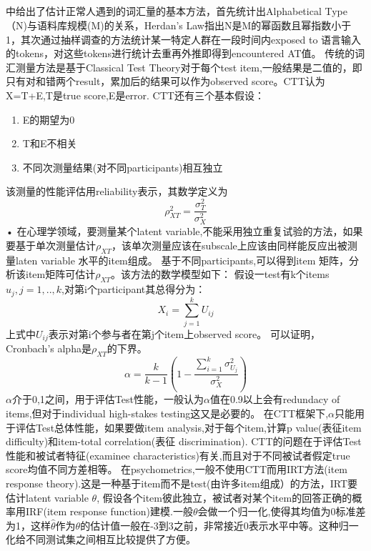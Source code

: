 \documentclass[12pt]{article}
\begin{document}
\subsection{\textbf{}}
\cite{Bib4}中给出了估计正常人遇到的词汇量的基本方法，首先统计出Alphabetical Type（N)与语料库规模(M)的关系，Herdan's Law指出N是M的幂函数且幂指数小于1，其次通过抽样调查的方法统计某一特定人群在一段时间内exposed to 语言输入的tokens，对这些tokens进行统计去重再外推即得到encountered AT值。
传统的词汇测量方法是基于Classical Test Theory对于每个test item,一般结果是二值的，即只有对和错两个result，累加后的结果可以作为observed score。CTT认为X=T+E,T是true score,E是error.
CTT还有三个基本假设：
\begin{enumerate}
\item{E的期望为0}
\item{T和E不相关}
\item{不同次测量结果(对不同participants)相互独立}
\end{enumerate}
该测量的性能评估用reliability表示，其数学定义为
\begin{equation}
\rho_{XT}^2=\frac{\sigma_T^2}{\sigma_X^2}
\end{equation}•
在心理学领域，要测量某个latent variable,不能采用独立重复试验的方法，如果要基于单次测量估计$\rho_{XT}$，该单次测量应该在subscale上应该由同样能反应出被测量laten variable 水平的item组成。
基于不同participants,可以得到item 矩阵，分析该item矩阵可估计$\rho_{XT}$。该方法的数学模型如下：
假设一test有k个items $u_j,j=1,..,k$,对第i个participant其总得分为：
\begin{equation}
X_i=\sum_{j=1}^k U_{ij}
\end{equation}
上式中$U_{ij}$表示对第i个参与者在第j个item上observed score。
可以证明，Cronbach's alpha是$\rho_{XT}$的下界。
\begin{equation}
\alpha=\frac{k}{k-1}(1-\frac{\sum_{i=1}^k \sigma_{U_j}^2}{\sigma_X^2})
\end{equation}
$\alpha$介于0,1之间，用于评估Test性能，一般认为$\alpha$值在0.9以上会有redundacy of items,但对于individual high-stakes testing这又是必要的。
在CTT框架下,$\alpha$只能用于评估Test总体性能，如果要做item analysis,对于每个item,计算p value(表征item difficulty)和item-total correlation(表征 discrimination).
CTT的问题在于评估Test性能和被试者特征(examinee characteristics)有关,而且对于不同被试者假定true score均值不同方差相等。
在psychometrics,一般不使用CTT而用IRT方法(item response theory).这是一种基于item而不是test(由许多item组成）的方法，IRT要估计latent variable $\theta$,
假设各个item彼此独立，被试者对某个item的回答正确的概率用IRF(item response function)建模.一般$\theta$会做一个归一化,使得其均值为0标准差为1，这样$\hat{\theta}$作为$\theta$的估计值一般在-3到3之前，非常接近0表示水平中等。这种归一化给不同测试集之间相互比较提供了方便。
\end{document}
